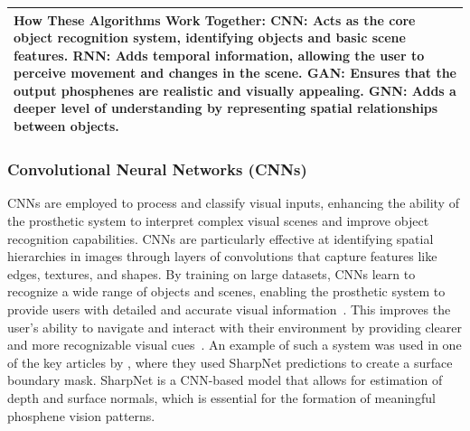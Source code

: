 \documentclass[twocolumn,10pt]{article}
\begin{document}
\begin{table}[ht!]
\begin{tabularx}{\textwidth}{|X|X|X|X|X|}
            \multicolumn{5}{|p{\dimexpr\textwidth-2\tabcolsep}|}{
            \textbf{How These Algorithms Work Together:}\newline
            \textbf{CNN:} Acts as the core object recognition system, identifying objects and basic scene features.\newline
            \textbf{RNN:} Adds temporal information, allowing the user to perceive movement and changes in the scene.\newline
            \textbf{GAN:} Ensures that the output phosphenes are realistic and visually appealing.\newline
            \textbf{GNN:} Adds a deeper level of understanding by representing spatial relationships between objects.
            }                                                                                                                                                                                                                                                                         \\ \hline
      \end{tabularx}
\end{table}

\subsubsection*{Convolutional Neural Networks (CNNs)}
CNNs are employed to process and classify visual inputs, enhancing the ability
of the prosthetic system to interpret complex visual scenes and improve object
recognition capabilities. CNNs are particularly effective at identifying spatial
hierarchies in images through layers of convolutions that capture features like
edges, textures, and shapes. By training on large datasets, CNNs learn to
recognize a wide range of objects and scenes, enabling the prosthetic system to
provide users with detailed and accurate visual
information~\parencite{petrosyanDecodingInterpretingCortical2021a}. This
improves the user's ability to navigate and interact with their environment by
providing clearer and more recognizable visual
cues~\parencite{maheswaranathanInterpretingRetinalNeural2023}. An example of
such a system was used in one of the key articles by
\textcite{deruytervansteveninckRealworldIndoorMobility2022}, where they used
SharpNet predictions to create a surface boundary mask. SharpNet is a CNN-based
model that allows for estimation of depth and surface normals, which is
essential for the formation of meaningful phosphene vision patterns.
\end{document}
